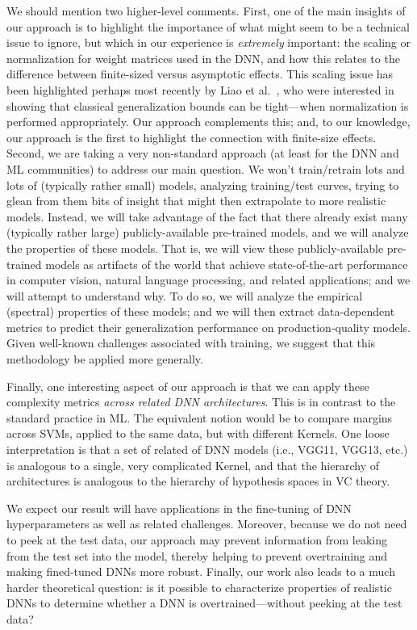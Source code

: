 We should mention two higher-level comments.
%
First, 
one of the main insights of our approach is to highlight the importance of what might seem to be a technical issue to ignore, but which in our experience is \emph{extremely} important: the scaling or normalization for weight matrices used in the DNN, and how this relates to the difference between finite-sized versus asymptotic effects.
This scaling issue has been highlighted perhaps most recently by Liao et al.~\cite{LMBx18_TR}, who were interested in showing that classical generalization bounds can be tight---when normalization is performed appropriately.
Our approach complements this; and, to our knowledge, our approach is the first to highlight the connection with finite-size effects.
%
Second, 
we are taking a 
very %
non-standard approach (at least for the DNN and ML communities) to address our main question.
We won't train/retrain lots and lots of (typically rather small) models, analyzing training/test curves, trying to glean from them bits of insight that might then extrapolate to more realistic models.
Instead, we will take advantage of the fact that there already exist many (typically rather large) publicly-available pre-trained models, and we will analyze the properties of these models.
That is, we will view these publicly-available pre-trained models as artifacts of the world that achieve state-of-the-art performance in computer vision, natural language processing, and related applications; and we will attempt to understand why.
To do so, we will analyze the empirical (spectral) properties of these models; 
and we will then extract data-dependent metrics to predict their generalization performance on production-quality models.
Given well-known challenges associated with training, 
we suggest that this methodology be applied more generally.

Finally, one interesting aspect of our approach is that we can apply these complexity metrics \emph{across related DNN architectures}. 
This is in contrast to the standard practice in ML.
The equivalent notion would be to compare margins across SVMs, applied to the same data, but with different Kernels. 
One loose interpretation is that a set of related of DNN models (i.e., VGG11, VGG13, etc.) is analogous to a single, very complicated Kernel, and that the hierarchy of architectures is analogous to the hierarchy of hypothesis spaces in VC theory.

We expect our result will have applications in the fine-tuning of DNN hyperparameters as well as related challenges.
Moreover, because we do not need to peek at the test data, our approach may prevent information from leaking from the test set into the model, thereby helping to prevent overtraining and making fined-tuned DNNs more robust.
Finally, our work also leads to a much harder theoretical question: is it possible to characterize properties of realistic DNNs to determine whether a DNN is overtrained---without peeking at the test data?  


